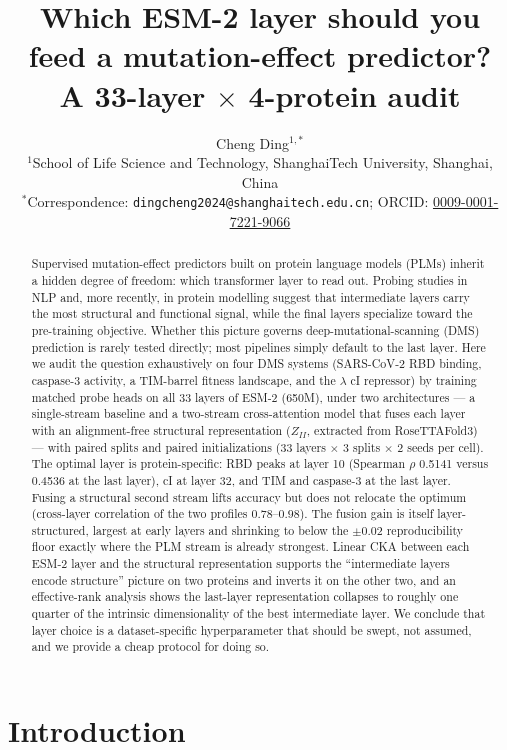 \documentclass[11pt]{article}
\title{Which ESM-2 layer should you feed a mutation-effect predictor?\\
A 33-layer $\times$ 4-protein audit}
\author{Cheng Ding$^{1,\ast}$\\
\small $^{1}$School of Life Science and Technology, ShanghaiTech University, Shanghai, China\\
\small $^{\ast}$Correspondence: \texttt{dingcheng2024@shanghaitech.edu.cn}; ORCID: \href{https://orcid.org/0009-0001-7221-9066}{0009-0001-7221-9066}}
\date{}
\begin{document}
\maketitle

\begin{abstract}
Supervised mutation-effect predictors built on protein language models (PLMs) inherit a
hidden degree of freedom: which transformer layer to read out. Probing studies in NLP and,
more recently, in protein modelling suggest that intermediate layers carry the most
structural and functional signal, while the final layers specialize toward the pre-training
objective. Whether this picture governs deep-mutational-scanning (DMS) prediction is rarely
tested directly; most pipelines simply default to the last layer. Here we audit the question
exhaustively on four DMS systems (SARS-CoV-2 RBD binding, caspase-3 activity, a TIM-barrel
fitness landscape, and the $\lambda$ cI repressor) by training matched probe heads on all 33
layers of ESM-2 (650M), under two architectures --- a single-stream baseline and a
two-stream cross-attention model that fuses each layer with an alignment-free structural
representation ($Z_{II}$, extracted from RoseTTAFold3) --- with paired splits and paired
initializations (33 layers $\times$ 3 splits $\times$ 2 seeds per cell). The optimal layer is
protein-specific: RBD peaks at layer 10 (Spearman $\rho$ 0.5141 versus 0.4536 at the last
layer), cI at layer 32, and TIM and caspase-3 at the last layer. Fusing a structural second
stream lifts accuracy but does not relocate the optimum (cross-layer correlation of the two
profiles $0.78$--$0.98$). The fusion gain is itself layer-structured, largest at early layers
and shrinking to below the $\pm 0.02$ reproducibility floor exactly where the PLM stream is
already strongest. Linear CKA between each ESM-2 layer and the structural representation
supports the ``intermediate layers encode structure'' picture on two proteins and inverts it
on the other two, and an effective-rank analysis shows the last-layer representation
collapses to roughly one quarter of the intrinsic dimensionality of the best intermediate
layer. We conclude that layer choice is a dataset-specific hyperparameter that should be
swept, not assumed, and we provide a cheap protocol for doing so.
\end{abstract}

\section{Introduction}
\end{document}
